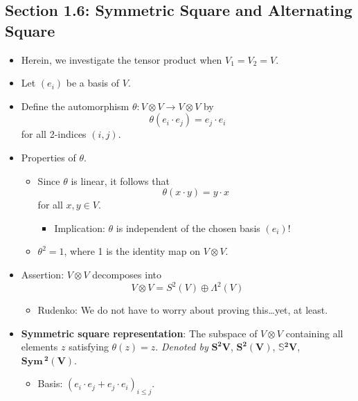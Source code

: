 \documentclass[../notes.tex]{subfiles}
\begin{document}
\subsection*{Section 1.6: Symmetric Square and Alternating Square}
\begin{itemize}
    \item Herein, we investigate the tensor product when $V_1=V_2=V$.
    \item Let $(e_i)$ be a basis of $V$.
    \item Define the automorphism $\theta:V\otimes V\to V\otimes V$ by
    \begin{equation*}
        \theta(e_i\cdot e_j) = e_j\cdot e_i
    \end{equation*}
    for all 2-indices $(i,j)$.
    \item Properties of $\theta$.
    \begin{itemize}
        \item Since $\theta$ is linear, it follows that
        \begin{equation*}
            \theta(x\cdot y) = y\cdot x
        \end{equation*}
        for all $x,y\in V$.
        \begin{itemize}
            \item Implication: $\theta$ is independent of the chosen basis $(e_i)$!
        \end{itemize}
        \item $\theta^2=1$, where 1 is the identity map on $V\otimes V$.
    \end{itemize}
    \item Assertion: $V\otimes V$ decomposes into
    \begin{equation*}
        V\otimes V = S^2(V)\oplus\Lambda^2(V)
    \end{equation*}
    \begin{itemize}
        \item Rudenko: We do not have to worry about proving this\dots yet, at least.
    \end{itemize}
    \item \textbf{Symmetric square representation}: The subspace of $V\otimes V$ containing all elements $z$ satisfying $\theta(z)=z$. \emph{Denoted by} $\bm{S^2V}$, $\bm{S^2(V)}$, $\pmb{\mathbb{S}}\bm{{}^2V}$, $\pmb{\textbf{Sym}}\,\bm{{}^2(V)}$.
    \begin{itemize}
        \item Basis: $(e_i\cdot e_j+e_j\cdot e_i)_{i\leq j}$.
        \begin{itemize}

\end{itemize}
\end{itemize}
\end{itemize}
\end{document}
